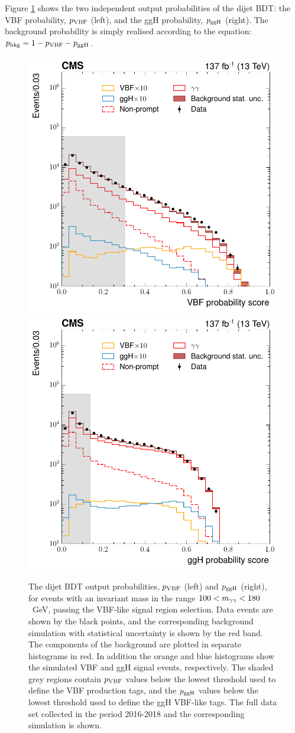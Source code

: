 Figure \ref{fig:dijetbdt_outputs} shows the two independent output probabilities of the dijet BDT: the VBF probability, $p_{\rm{VBF}}$ (left), and the ggH probability, $p_{\rm{ggH}}$ (right). The background probability is simply realised according to the equation: $p_{\rm{bkg}}=1-p_{\rm{VBF}}-p_{\rm{ggH}}$. 

\begin{figure}[htb!]
  \centering
  \includegraphics[width=.4\textwidth]{Figures/hgg_overview/DijetBDT_DD_vbfMvaResult_prob_VBF_logPlot.pdf}
  \includegraphics[width=.4\textwidth]{Figures/hgg_overview/DijetBDT_ggHprob.pdf}
  \caption[Dijet BDT output probabilities: $p_{\rm{VBF}}$ and $p_{\rm{ggH}}$]
  {
    The dijet BDT output probabilities, $p_{\rm{VBF}}$ (left) and $p_{\rm{ggH}}$ (right), for events with an invariant mass in the range $100<m_{\gamma\gamma}<180$~GeV, passing the VBF-like signal region selection. Data events are shown by the black points, and the corresponding background simulation with statistical uncertainty is shown by the red band. The components of the background are plotted in separate histograms in red. In addition the orange and blue histograms show the simulated VBF and ggH signal events, respectively. The shaded grey regions contain $p_{\rm{VBF}}$ values below the lowest threshold used to define the VBF production tags, and the $p_{\rm{ggH}}$ values below the lowest threshold used to define the ggH VBF-like tags. The full data set collected in the period 2016-2018 and the corresponding simulation is shown.
  }
  \label{fig:dijetbdt_outputs}
\end{figure}

